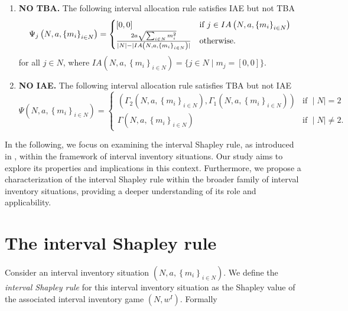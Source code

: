 \documentclass[12pt]{article}
\begin{document}
 \begin{enumerate}
     \item \textbf{NO TBA.} The following interval allocation rule satisfies IAE but not TBA
     \begin{equation*}
\Psi_j \left(N,a,\left\{m_i\right\} _{i\in
N}\right)=%
\begin{cases}
[0,0] & \text{if }  j\in IA\left(N,a,\left\{m_i\right\} _{i\in
N}\right) \\ 
\frac{2a\sqrt{%
\sum_{i\in N}m_{i}^{2}}}{|N|-|IA\left(N,a,\left\{m_i\right\} _{i\in
N}\right)|}& \text{otherwise. }
\end{cases}%
\end{equation*}%
for all $j\in N$, where $IA\left(N,a,\left\{m_i\right\} _{i\in
N}\right)=\{j\in N\;|\; m_j=[0,0]\}$.
     \item \textbf{NO IAE.} The following interval allocation rule satisfies TBA but not IAE 
\begin{equation*}
\Psi \left(N,a,\left\{m_i\right\} _{i\in
N}\right)=%
\begin{cases}
(\Gamma_{2}(N,a,\left\{ m_{i}\right\}_{i\in
N}),\Gamma_{1}(N,a,\left\{ m_{i}\right\}_{i\in
N})) & \text{if } \mid N\mid =2 \\ 
\Gamma (N,a,\left\{ m_{i}\right\}_{i\in
N}) & \text{if } \mid N \mid \neq 2.%
\end{cases}%
\end{equation*}%
 \end{enumerate}




In the following, we focus on examining the interval Shapley rule, as introduced in \cite{Alparslan2010Axiomatization}, within the framework of interval inventory situations. Our study aims to explore its properties and implications in this context. Furthermore, we propose a characterization of the interval Shapley rule within the broader family of interval inventory situations, providing a deeper understanding of its role and applicability. 

\section{The interval Shapley rule}\label{sec:4}


\noindent Consider an interval inventory situation $\left( N,a,\left\{
m_{i}\right\} _{i\in N}\right)$. We define the \textit{interval Shapley rule} for this interval inventory situation as the Shapley value of the associated interval inventory game $\left( N,w^I\right).$ Formally  
\end{document}
